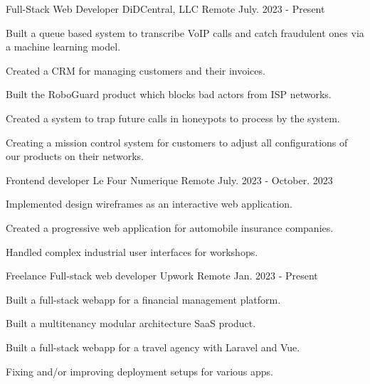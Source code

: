 

\begin{cventries}
  \cventry
    {Full-Stack Web Developer} %
    {DiDCentral, LLC} %
    {Remote} %
    {July. 2023 - Present} %
    {
      \begin{cvitems} %
        \item {Built a queue based system to transcribe VoIP calls and catch fraudulent ones via a machine learning model.}
        \item {Created a CRM for managing customers and their invoices.}
        \item {Built the RoboGuard product which blocks bad actors from ISP networks.}
        \item {Created a system to trap future calls in honeypots to process by the system.}
        \item {Creating a mission control system for customers to adjust all configurations of our products on their networks.}
      \end{cvitems}
    }

  \cventry
    {Frontend developer} %
    {Le Four Numerique} %
    {Remote} %
    {July. 2023 - October. 2023} %
    {
      \begin{cvitems} %
        \item {Implemented design wireframes as an interactive web application.}
        \item {Created a progressive web application for automobile insurance companies.}
        \item {Handled complex industrial user interfaces for workshops.}
      \end{cvitems}
    }

  \cventry
    {Freelance Full-stack web developer} %
    {Upwork} %
    {Remote} %
    {Jan. 2023 - Present} %
    {
      \begin{cvitems} %
        \item {Built a full-stack webapp for a financial management platform.}
        \item {Built a multitenancy modular architecture SaaS product.}
        \item {Built a full-stack webapp for a travel agency with Laravel and Vue.}
        \item {Fixing and/or improving deployment setups for various apps.}
      \end{cvitems}
    }


\end{cventries}

